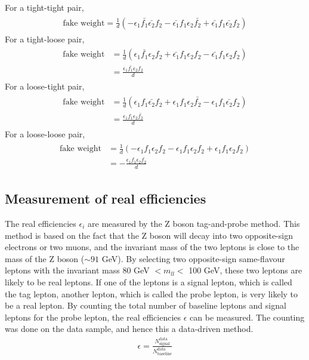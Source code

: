 For a tight-tight pair,
\begin{align}
\begin{split}
\text{fake weight} = \frac{1}{d} (
- \epsilon_1 \bar{f_1} \bar{\epsilon_2} f_2
- \bar{\epsilon_1} f_1 \epsilon_2 \bar{f_2}
+ \bar{\epsilon_1} f_1 \bar{\epsilon_2} f_2 )
\end{split}
\end{align}
For a tight-loose pair,
\begin{align}
\begin{split}
\text{fake weight} &= \frac{1}{d} (
\epsilon_1 \bar{f_1} \epsilon_2 f_2
+ \bar{\epsilon_1} f_1 \epsilon_2 f_2
- \bar{\epsilon_1} f_1 \epsilon_2 f_2 ) \\
&= \frac{\epsilon_1 \bar{f_1} \epsilon_2 f_2}{d}
\end{split}
\end{align}
For a loose-tight pair,
\begin{align}
\begin{split}
\text{fake weight} &= \frac{1}{d} (
\epsilon_1 f_1 \bar{\epsilon_2} f_2
+ \epsilon_1 f_1 \epsilon_2 \bar{f_2}
- \epsilon_1 f_1 \bar{\epsilon_2} f_2 ) \\
&= \frac{\epsilon_1 f_1 \epsilon_2 \bar{f_2}}{d}
\end{split}
\end{align}
For a loose-loose pair,
\begin{align}
\begin{split}
\text{fake weight} &= \frac{1}{d} (
- \epsilon_1 f_1 \epsilon_2 f_2
- \epsilon_1 f_1 \epsilon_2 f_2
+ \epsilon_1 f_1 \epsilon_2 f_2 ) \\
&= - \frac{\epsilon_1 f_1 \epsilon_2 f_2}{d}
\end{split}
\end{align}

\subsection{Measurement of real efficiencies}
The real efficiencies $\epsilon_i$ are measured by the Z boson tag-and-probe method.
This method is based on the fact that the Z boson will decay into two opposite-sign electrons or two muons, and the invariant mass of the two leptons is close to the mass of the Z boson ($\sim 91$ GeV).
By selecting two opposite-sign same-flavour leptons with the invariant mass 80 GeV $< m_{ll} <$ 100 GeV, these two leptons are likely to be real leptons.
If one of the leptons is a signal lepton, which is called the tag lepton, another lepton, which is called the probe lepton, is very likely to be a real lepton.
By counting the total number of baseline leptons and signal leptons for the probe lepton, the real efficiencies $\epsilon$ can be measured.
The counting was done on the data sample, and hence this a data-driven method.
\begin{align}
\epsilon = \frac{N^{\text{data}}_{\text{signal}}}{N^{\text{data}}_{\text{baseline}}}
\end{align}

